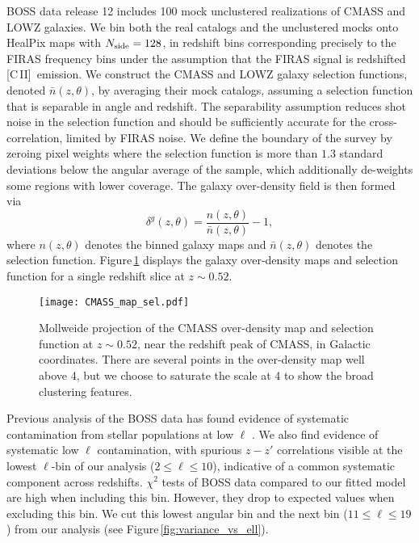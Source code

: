 \documentclass[fleqn,usenatbib]{mnras}
\newcommand{\cii}{[C{\sc\,II}]}
\begin{document}
BOSS data release 12 \citep{alam2015eleventh} includes 100 mock unclustered realizations of CMASS and LOWZ galaxies. We bin both the real catalogs and the unclustered mocks onto HealPix maps with $N_{\rm side}=128$, in redshift bins corresponding precisely to the FIRAS frequency bins under the assumption that the FIRAS signal is redshifted \cii\ emission. We construct the CMASS and LOWZ galaxy selection functions, denoted $\bar n(z, \theta)$, by averaging their mock catalogs, assuming a selection function that is separable in angle and redshift. The separability assumption reduces shot noise in the selection function and should be sufficiently accurate for the cross-correlation, limited by FIRAS noise. We define the boundary of the survey by zeroing pixel weights where the selection function is more than $1.3$ standard deviations below the angular average of the sample, which additionally de-weights some regions with lower coverage. The galaxy over-density field is then formed via 
\begin{equation}
\delta^g(z, \theta) = \frac{n(z,\theta)}{\bar n(z, \theta)} - 1,
\end{equation}
where $n(z,\theta)$ denotes the binned galaxy maps and $\bar n(z, \theta)$ denotes the selection function. Figure\,\ref{fig:CMASS_sel} displays the galaxy over-density maps and selection function for a single redshift slice at $z\sim0.52$.
\begin{figure}
  \texttt{[image: CMASS\_map\_sel.pdf]}
  \caption{ \label{fig:CMASS_sel} Mollweide projection of the CMASS over-density map and selection function at $z\sim0.52$, near the redshift peak of CMASS, in Galactic coordinates. There are several points in the over-density map well above 4, but we choose to saturate the scale at 4 to show the broad clustering features.} 
\end{figure}

Previous analysis of the BOSS data has found evidence of systematic contamination from stellar populations at low $\ell$ \citep{loureiro2019cosmological}. We also find evidence of systematic low $\ell$ contamination, with spurious $z-z'$ correlations visible at the lowest $\ell$-bin of our analysis ($2\leq \ell \leq 10$), indicative of a common systematic component across redshifts. $\chi^2$ tests of BOSS data compared to our fitted model are high when including this bin. However, they drop to expected values when excluding this bin. We cut this lowest angular bin and the next bin ($11\leq \ell \leq 19$) from our analysis (see Figure\,\ref{fig:variance_vs_ell}). 
\end{document}
